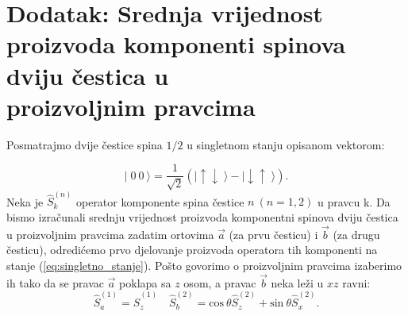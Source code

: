 \appendix


\chapter*{Dodatak: Srednja vrijednost proizvoda komponenti spinova dviju \v cestica u \\ proizvoljnim pravcima}
\setcounter{chapter}{4} \setcounter{equation}{0}

Posmatrajmo dvije čestice spina $1/2$ u singletnom stanju opisanom vektorom:

\begin{equation}
    | \;\! 0 \:\! 0 \:\! \rangle = \frac{1}{\sqrt2}(| \! \uparrow\downarrow \;\! \rangle - | \! \downarrow\uparrow \;\! \rangle) \label{eq:singletno_stanje}.
\end{equation}
Neka je $\hat{S}_k^{(n)}$ operator komponente spina čestice $n \ (n = 1, 2)$ u pravcu k. Da bismo izračunali srednju vrijednost proizvoda komponentni spinova dviju čestica u proizvoljnim pravcima zadatim ortovima $\vec{a}$ (za prvu česticu) i $\vec{b}$ (za drugu česticu), odredićemo prvo djelovanje proizvoda operatora tih komponenti na stanje (\ref{eq:singletno_stanje}).
Pošto govorimo o proizvoljnim pravcima izaberimo ih tako da se pravac $\vec{a}$ poklapa sa $z$ osom, a pravac $\vec{b}$ neka leži u $xz$ ravni:
\begin{equation}
    \hat{S}_a^{(1)} = \hat{S}_z^{(1)} \quad \hat{S}_b^{(2)} = \mathrm{cos} \:\! \theta \hat{S}_z^{(2)} + \mathrm{sin} \:\! \theta \hat{S}_x^{(2)}.
\end{equation}



